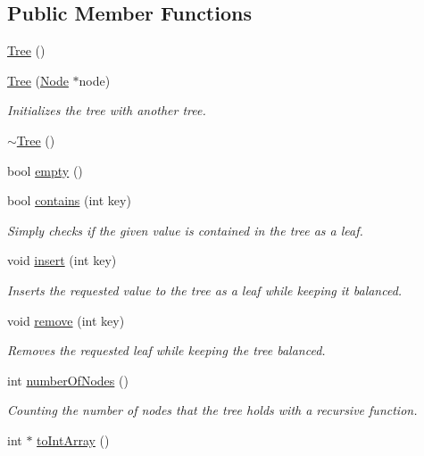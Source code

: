 \subsection*{Public Member Functions}
\begin{DoxyCompactItemize}
\item 
\hyperlink{class_tree_ad376a7c639d857312f5de2ef47482f68}{Tree} ()
\item 
\hyperlink{class_tree_ad913989ea4c1195b32b2082860560bf0}{Tree} (\hyperlink{class_node}{Node} $\ast$node)
\begin{DoxyCompactList}\small\item\em Initializes the tree with another tree. \end{DoxyCompactList}\item 
\hyperlink{class_tree_abdc38545cf3f588725b5d8b8075b3866}{$\sim$\-Tree} ()
\item 
bool \hyperlink{class_tree_a853993d1cc8acbf1ca26a98bc50e3795}{empty} ()
\item 
bool \hyperlink{class_tree_abb768469ad246c52c8b5ba6ad9c02f70}{contains} (int key)
\begin{DoxyCompactList}\small\item\em Simply checks if the given value is contained in the tree as a leaf. \end{DoxyCompactList}\item 
void \hyperlink{class_tree_a0b32b0ca65d8ef7df1dc3a1bd0cf6a99}{insert} (int key)
\begin{DoxyCompactList}\small\item\em Inserts the requested value to the tree as a leaf while keeping it balanced. \end{DoxyCompactList}\item 
void \hyperlink{class_tree_a0015486626ad4da2a7dba4f60ed9aa79}{remove} (int key)
\begin{DoxyCompactList}\small\item\em Removes the requested leaf while keeping the tree balanced. \end{DoxyCompactList}\item 
int \hyperlink{class_tree_a455b10d21349072737b951ad34c2311a}{number\-Of\-Nodes} ()
\begin{DoxyCompactList}\small\item\em Counting the number of nodes that the tree holds with a recursive function. \end{DoxyCompactList}\item 
int $\ast$ \hyperlink{class_tree_a730a56b16e855a1b08a24ee11840d508}{to\-Int\-Array} ()

\end{DoxyCompactItemize}
